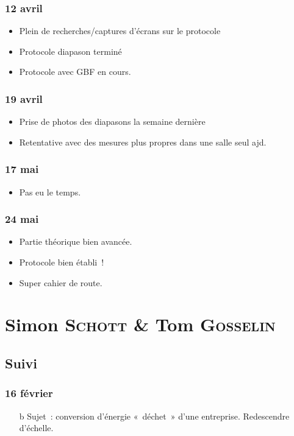 \documentclass[a4paper, 11pt, final, garamond]{book}
\begin{document}
\subsection{12 avril}
\begin{itemize}
	\item Plein de recherches/captures d'écrans sur le protocole
	\item Protocole diapason terminé
	\item Protocole avec GBF en cours.
\end{itemize}

\subsection{19 avril}
\begin{itemize}
	\item Prise de photos des diapasons la semaine dernière
	\item Retentative avec des mesures plus propres dans une salle seul ajd.
\end{itemize}

\subsection{17 mai}
\begin{itemize}
	\item Pas eu le temps.
\end{itemize}

\subsection{24 mai}
\begin{itemize}
	\item Partie théorique bien avancée.
	\item Protocole bien établi~!
	\item Super cahier de route.
\end{itemize}

\chapter{Simon \textsc{Schott} \& Tom \textsc{Gosselin}}
\label{ch:schottgosselin}

\section{Suivi}
\subsection{16 février}
\begin{itemize}
	\item[b]{Sujet}~: conversion d'énergie «~déchet~» d'une entreprise. Redescendre
	d'échelle.
\end{itemize}
\end{document}
